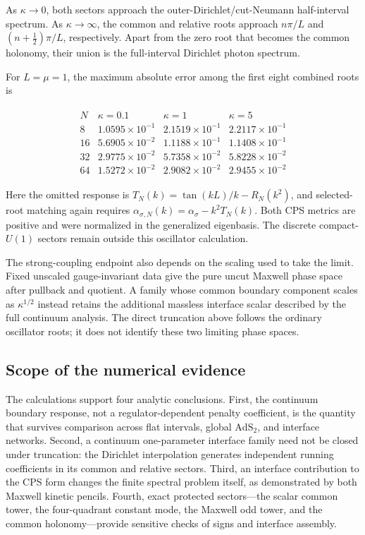 As $\kappa\to0$, both sectors approach the outer-Dirichlet/cut-Neumann half-interval spectrum. As $\kappa\to\infty$, the common and relative roots approach $n\pi/L$ and $(n+\frac12)\pi/L$, respectively. Apart from the zero root that becomes the common holonomy, their union is the full-interval Dirichlet photon spectrum.

For $L=\mu=1$, the maximum absolute error among the first eight combined roots is

\begin{align}
\begin{array}{c|ccc}
N & \kappa=0.1 & \kappa=1 & \kappa=5 \\ \hline
8  & 1.0595\times10^{-1} & 2.1519\times10^{-1} & 2.2117\times10^{-1} \\
16 & 5.6905\times10^{-2} & 1.1188\times10^{-1} & 1.1408\times10^{-1} \\
32 & 2.9775\times10^{-2} & 5.7358\times10^{-2} & 5.8228\times10^{-2} \\
64 & 1.5272\times10^{-2} & 2.9082\times10^{-2} & 2.9455\times10^{-2}
\end{array}
\end{align}

Here the omitted response is $T_N(k)=\tan(kL)/k-R_N(k^2)$, and selected-root matching again requires $\alpha_{\sigma,N}(k)=\alpha_\sigma-k^2T_N(k)$. Both CPS metrics are positive and were normalized in the generalized eigenbasis. The discrete compact-$U(1)$ sectors remain outside this oscillator calculation.

The strong-coupling endpoint also depends on the scaling used to take the limit. Fixed unscaled gauge-invariant data give the pure uncut Maxwell phase space after pullback and quotient. A family whose common boundary component scales as $\kappa^{1/2}$ instead retains the additional massless interface scalar described by the full continuum analysis. The direct truncation above follows the ordinary oscillator roots; it does not identify these two limiting phase spaces.

\subsection{Scope of the numerical evidence}\label{subsec:numerics-scope}

The calculations support four analytic conclusions. First, the continuum boundary response, not a regulator-dependent penalty coefficient, is the quantity that survives comparison across flat intervals, global $\mathrm{AdS}_2$, and interface networks. Second, a continuum one-parameter interface family need not be closed under truncation: the Dirichlet interpolation generates independent running coefficients in its common and relative sectors. Third, an interface contribution to the CPS form changes the finite spectral problem itself, as demonstrated by both Maxwell kinetic pencils. Fourth, exact protected sectors---the scalar common tower, the four-quadrant constant mode, the Maxwell odd tower, and the common holonomy---provide sensitive checks of signs and interface assembly.

